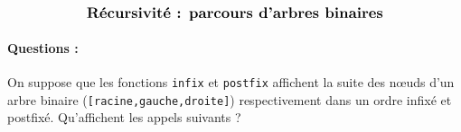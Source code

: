 \documentclass[11pt,a4paper]{article}
\begin{document}
\entete

\autoevaluation


$$\mbox{\textbf{\large Récursivité : parcours d'arbres binaires}}$$


\paragraph{Questions :}
On suppose que les fonctions \texttt{infix} et \texttt{postfix} affichent la suite des n\oe uds
d'un arbre binaire (\texttt{[racine,gauche,droite]}) respectivement dans un ordre infixé et postfixé.
Qu'affichent les appels suivants ?
\end{document}
